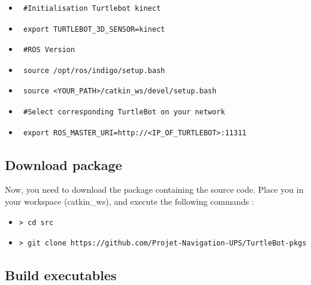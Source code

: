 \documentclass[10pt,a4paper]{article}
\begin{document}
\begin{itemize}
\item[]  \begin{verbatim} #Initialisation Turtlebot kinect \end{verbatim}
\item[]  \begin{verbatim} export TURTLEBOT_3D_SENSOR=kinect \end{verbatim}
\item[]  \begin{verbatim} #ROS Version \end{verbatim}
\item[]  \begin{verbatim} source /opt/ros/indigo/setup.bash \end{verbatim}
\item[]  \begin{verbatim} source <YOUR_PATH>/catkin_ws/devel/setup.bash \end{verbatim}
\item[]  \begin{verbatim} #Select corresponding TurtleBot on your network \end{verbatim}
\item[]  \begin{verbatim} export ROS_MASTER_URI=http://<IP_OF_TURTLEBOT>:11311  \end{verbatim}
\end{itemize}

\subsection{Download package}

Now, you need to download the package containing the source code. Place you in your workspace (catkin\_ws), and execute the following commands :

\begin{itemize}
\item[]  \begin{verbatim}> cd src \end{verbatim}
\item[]  \begin{verbatim}> git clone https://github.com/Projet-Navigation-UPS/TurtleBot-pkgs \end{verbatim}
\end{itemize}

\subsection{Build executables}
\end{document}
